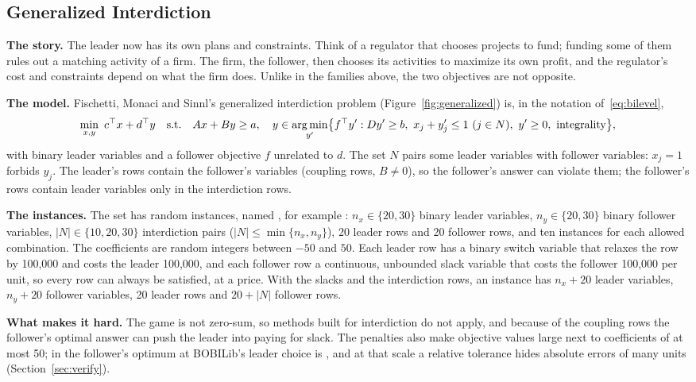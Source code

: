 \subsection{Generalized Interdiction}\label{sec:prob-generalized}

\textbf{The story.} The leader now has its own plans and constraints. Think of a regulator that
chooses projects to fund; funding some of them rules out a matching activity of a firm. The
firm, the follower, then chooses its activities to maximize its own profit, and the regulator's
cost and constraints depend on what the firm does. Unlike in the families above, the two
objectives are not opposite.

\textbf{The model.} Fischetti, Monaci and Sinnl's generalized interdiction
problem\cite{fischetti2018dynamic} (Figure~\ref{fig:generalized}) is, in the notation
of~\eqref{eq:bilevel},
\[
\min_{x,y}\ c^{\top} x+d^{\top} y\quad\text{s.t.}\quad Ax+By\ge a,\quad
y\in\operatorname*{arg\,min}_{y'}\bigl\{f^{\top} y' : Dy'\ge b,\ x_j+y'_j\le 1\ (j\in N),\ y'\ge 0,\
\text{integrality}\bigr\},
\]
with binary leader variables and a follower objective $f$ unrelated to $d$. The set $N$ pairs some
leader variables with follower variables: $x_j=1$ forbids $y_j$. The leader's rows contain the
follower's variables (coupling rows, $B\ne 0$), so the follower's answer can violate them; the
follower's rows contain leader variables only in the interdiction rows.

\textbf{The instances.} The set  has \FamGeneralizedAll{} random
instances,\cite{fischetti2018dynamic} named , for example
\inst{general20-30-20-20-20-2}: $n_x\in\{20,30\}$ binary leader variables, $n_y\in\{20,30\}$ binary
follower variables, $|N|\in\{10,20,30\}$ interdiction pairs ($|N|\le\min\{n_x,n_y\}$), 20 leader
rows and 20 follower rows, and ten instances for each allowed combination. The coefficients are
random integers between $-50$ and $50$. Each leader row has a binary switch variable that relaxes
the row by 100,000 and costs the leader 100,000, and each follower row a continuous, unbounded
slack variable that costs the follower 100,000 per unit, so every row can always be satisfied, at a
price. With the slacks and the interdiction rows, an
instance has $n_x+20$ leader variables, $n_y+20$ follower variables, 20 leader rows and $20+|N|$
follower rows.

\textbf{What makes it hard.} The game is not zero-sum, so methods built for interdiction do not
apply, and because of the coupling rows the follower's optimal answer can push the leader into
paying for slack. The penalties also make objective values large next to coefficients of at most
50; in \inst{general20-30-20-20-20-2} the follower's optimum at BOBILib's leader choice is
\GenTolPhiOpt, and at that scale a relative tolerance hides absolute errors of many units
(Section~\ref{sec:verify}).

